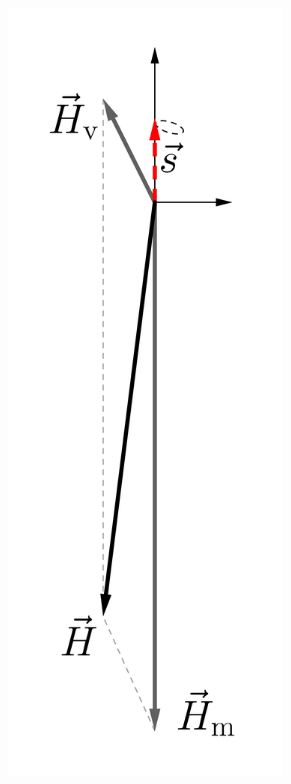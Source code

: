 \begin{figure}[htbp]	
	\centering
	\begin{subfigure}[t]{0.3\textwidth}
		\centering
		\includegraphics[width=0.8\textwidth]{chapters/assets/basics/matter-effect-large-density}

\end{subfigure}
\end{figure}
